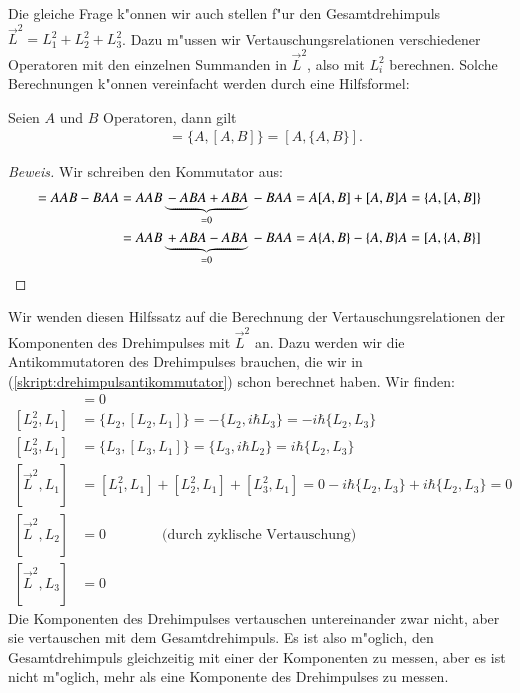 Die gleiche Frage k"onnen wir auch stellen f"ur den Gesamtdrehimpuls
$\vec L^2=L_1^2+L_2^2+L_3^2$. Dazu m"ussen wir Vertauschungsrelationen
verschiedener Operatoren mit den einzelnen Summanden in $\vec L^2$, also
mit $L_i^2$ berechnen.
Solche Berechnungen k"onnen vereinfacht werden durch eine Hilfsformel:

\begin{hilfssatz}
\label{skript:commutatora2b}
Seien $A$ und $B$ Operatoren, dann gilt
\begin{align*}
[A^2,B]
&=
\{A,[A,B]\}
=
[A,\{A,B\}].
\end{align*}
\end{hilfssatz}

\begin{proof}[Beweis]
Wir schreiben den Kommutator aus:
\begin{align*}
[A^2,B]
=
AAB-BAA
&=
AAB\underbrace{\mathstrut -ABA+ABA}_{=0}\mathstrut -BAA
=
A[A,B]+[A,B]A
=
\{A,[A,B]\}
\\
&=
AAB\underbrace{\mathstrut +ABA-ABA}_{=0}\mathstrut -BAA
=
A\{A,B\}-\{A,B\}A
=
[A,\{A,B\}]
\end{align*}
\end{proof}

Wir wenden diesen Hilfssatz auf die Berechnung der Vertauschungsrelationen
der Komponenten des Drehimpulses mit $\vec L^2$ an.
Dazu werden wir die Antikommutatoren des Drehimpulses brauchen, die
wir in (\ref{skript:drehimpulsantikommutator}) schon berechnet haben.
Wir finden:
\begin{align*}
[L_1^2,L_1]&=0
\\
[L_2^2,L_1]
&=
\{L_2,[L_2,L_1]\}
=
-\{L_2,i\hbar L_3\}
=-i\hbar\{L_2,L_3\}
\\
[L_3^2,L_1]
&=
\{L_3,[L_3,L_1]\}
=
\{L_3,i\hbar L_2\}
=
i\hbar\{L_2,L_3\}
\\
[\vec L^2, L_1]
&=
[L_1^2,L_1]
+
[L_2^2,L_1]
+
[L_3^2,L_1]
=
0
-i\hbar\{L_2,L_3\}
+
i\hbar\{L_2,L_3\}
=
0
\\
[\vec L^2,L_2]&=0
\qquad
\qquad
\text{(durch zyklische Vertauschung)}
\\
[\vec L^2,L_3]&=0
\end{align*}
Die Komponenten des Drehimpulses vertauschen untereinander zwar nicht,
aber sie vertauschen mit dem Gesamtdrehimpuls. Es ist also m"oglich,
den Gesamtdrehimpuls gleichzeitig mit einer der Komponenten zu messen,
aber es ist nicht m"oglich, mehr als eine Komponente des Drehimpulses
zu messen.

